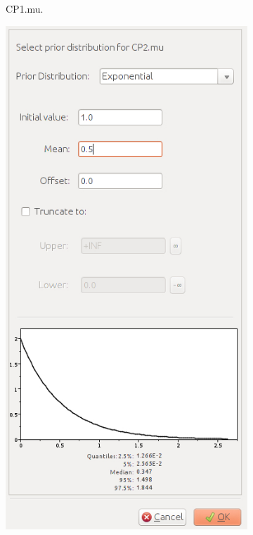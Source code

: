 {\begin{figure}[htbp]
\begin{subfigure}[b]{0.3\textwidth}
            \caption{CP1.mu.}
            \label{fig:beautiPriorsCP1mu}
        \end{subfigure}
        \begin{subfigure}[b]{0.3\textwidth}
            \includegraphics[width=\textwidth]{../screenshots/beauti-prior-cp2mu.jpg}

\end{subfigure}
\end{figure}}
